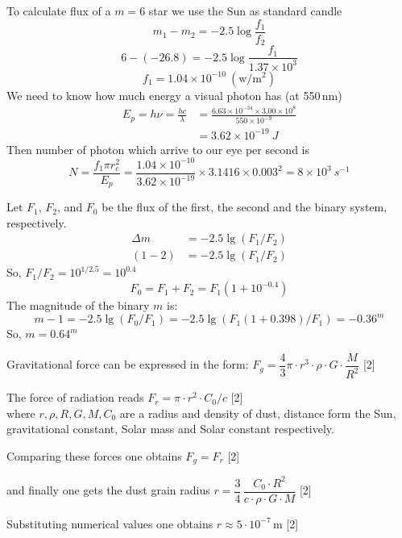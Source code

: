 To calculate flux of a $m = 6$ star we use the Sun as standard candle
\[
m_1 - m_2 = -2.5 \log\frac{f_1}{f_2} \tag*{(1 point)}
\]
\[
6 - (-26.8) = -2.5 \log\frac{f_1}{1.37 \times 10^{3}}
\]
\[
f_1 = 1.04 \times 10^{-10}~(\mathrm{w/m^2}) \tag*{(3 points)}
\]
We need to know how much energy a visual photon has (at 550\,nm)
\begin{align*}
E_p = h\nu = \frac{hc}{\lambda}
&= \frac{6.63 \times 10^{-34} \times 3.00 \times 10^{8}}{550 \times 10^{-9}}\\
&= 3.62 \times 10^{-19}~J \tag*{(3 points)}
\end{align*}
Then number of photon which arrive to our eye per second is
\[
N = \frac{f_1 \pi r_e^2}{E_p}
  = \frac{1.04 \times 10^{-10}}{3.62 \times 10^{-19}} \times 3.1416 \times 0.003^2
  = 8 \times 10^{3}~s^{-1} \tag*{(3 points)}
\]

Let $F_1$, $F_2$, and $F_0$ be the flux of the first, the second and the binary
system, respectively.
\begin{align*}
\Delta m &= -2.5 \lg (F_1/F_2)\\
(1-2) &= -2.5 \lg (F_1/F_2) \tag*{5}
\end{align*}
So, $F_1/F_2 = 10^{1/2.5} = 10^{0.4}$
\begin{equation*}
F_0 = F_1 + F_2 = F_1 (1 + 10^{-0.4}) \tag*{3}
\end{equation*}
The magnitude of the binary $m$ is:
\begin{equation*}
m - 1 = -2.5 \lg (F_0/F_1) = -2.5 \lg (F_1 (1+0.398)/F_1) = -0.36^m \tag*{2}
\end{equation*}
So, $m = 0.64^m$

Gravitational force can be expressed in the form:
$F_g = \dfrac{4}{3}\pi \cdot r^3 \cdot \rho \cdot G \cdot \dfrac{M}{R^2}$ \hfill[2]

The force of radiation reads $F_r = \pi \cdot r^2 \cdot C_0/c$ \hfill[2]\\
where $r, \rho, R, G, M, C_0$ are a radius and density of dust, distance form %
the Sun, gravitational constant, Solar mass and Solar constant respectively.

Comparing these forces one obtains $F_g = F_r$ \hfill[2]

and finally one gets the dust grain radius
$r = \dfrac{3}{4}\,\dfrac{C_0 \cdot R^2}{c \cdot \rho \cdot G \cdot M}$ \hfill[2]

Substituting numerical values one obtains $r \approx 5 \cdot 10^{-7}$\,m \hfill[2]

